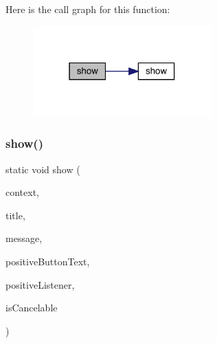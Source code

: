 Here is the call graph for this function\+:
\nopagebreak
\begin{figure}[H]
\begin{center}
\leavevmode
\includegraphics[width=195pt]{classcom_1_1toast_1_1android_1_1gamebase_1_1base_1_1ui_1_1_simple_alert_dialog_a031f7fecb54ba0724285ad5f9c991913_cgraph}
\end{center}
\end{figure}
\mbox{\label{classcom_1_1toast_1_1android_1_1gamebase_1_1base_1_1ui_1_1_simple_alert_dialog_a19e406a26de22bbc95ff8cb38a20cdb8}} 
\subsubsection{\texorpdfstring{show()}{show()}\hspace{0.1cm}{\footnotesize\ttfamily [4/6]}}
{\footnotesize\ttfamily static void show (\begin{DoxyParamCaption}\item[{@Non\+Null final Context}]{context,  }\item[{@Non\+Null final String}]{title,  }\item[{@Non\+Null final String}]{message,  }\item[{@Nullable final String}]{positive\+Button\+Text,  }\item[{@Nullable final Dialog\+Interface.\+On\+Click\+Listener}]{positive\+Listener,  }\item[{final boolean}]{is\+Cancelable }\end{DoxyParamCaption})\hspace{0.3cm}{\ttfamily [static]}}

